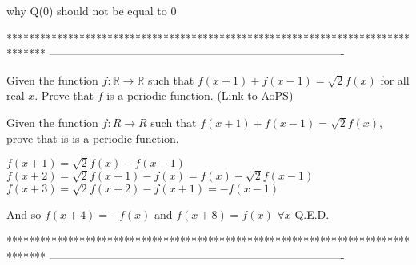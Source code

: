 \begin{solution}
	why Q(0)  should not be equal to 0

\end{solution}
*******************************************************************************
-------------------------------------------------------------------------------

\begin{problem}
	Given the function $f: \mathbb R \to \mathbb R$ such that $f(x+1)+f(x-1)=\sqrt{2}f(x)$ for all real $x$. Prove that $f$ is a periodic function.
	\flushright \href{https://artofproblemsolving.com/community/c6h391357}{(Link to AoPS)}
\end{problem}



\begin{solution}
	\begin{tcolorbox}Given the function $ f:R\to R $ such that $f(x+1)+f(x-1)=\sqrt{2}f(x)$, prove that is is a periodic function.\end{tcolorbox}
$f(x+1)=\sqrt 2f(x)-f(x-1)$
$f(x+2)=\sqrt 2f(x+1)-f(x)=f(x)-\sqrt 2f(x-1)$
$f(x+3)=\sqrt 2f(x+2)-f(x+1)=-f(x-1)$

And so $f(x+4)=-f(x)$ and $f(x+8)=f(x)$ $\forall x$
Q.E.D.
\end{solution}
*******************************************************************************
-------------------------------------------------------------------------------

